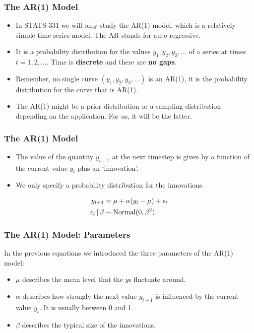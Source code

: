 \documentclass{beamer}
\newcommand{\given}{\,|\,}
\begin{document}
\begin{frame}
\frametitle{The AR(1) Model}

\begin{itemize}
\item In STATS 331 we will only study the AR(1) model, which is a relatively simple
time series model. The AR stands for auto-regressive.\pause
\item It is a probability distribution for the values $y_1, y_2, y_3, ...$
of a series at times $t=1, 2, ...$.
Time is {\bf discrete} and there are {\bf no gaps}.\pause
\item Remember, no single curve $(y_1, y_2, y_3, ...)$ is an AR(1), it is
the probability distribution for the curve that is AR(1).\pause
\item The AR(1) might be a prior distribution or a sampling distribution
depending on the application. For us, it will be the latter.
\end{itemize}
\end{frame}

\begin{frame}
\frametitle{The AR(1) Model}

\begin{itemize}
\item The value of the quantity $y_{t+1}$ at the next timestep is given by
a function of the current value $y_{t}$ plus an `innovation'.\pause
\item We only specify a probability distribution for the innovations.\pause
\end{itemize}
\begin{align}
y_{t+1} &= \mu + \alpha(y_t - \mu) + \epsilon_t \\
\epsilon_t \given \beta &\sim \textnormal{Normal}(0, \beta^2).
\end{align}

\end{frame}


\begin{frame}
\frametitle{The AR(1) Model: Parameters}
In the previous equations we introduced the
three parameters of the AR(1) model:\pause
\begin{itemize}
\item $\mu$ describes the mean level that the $y$s fluctuate around.\pause
\item $\alpha$ describes how strongly the next value $y_{t+1}$ is influenced
by the current value $y_t$. It is usually between 0 and 1.\pause
\item $\beta$ describes the typical size of the innovations.
\end{itemize}

\end{frame}
\end{document}
